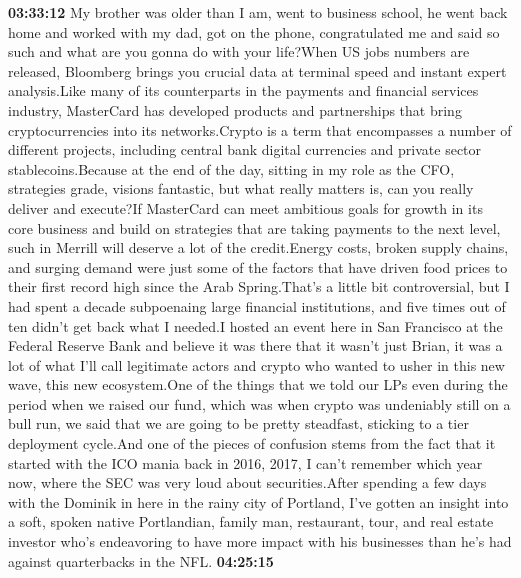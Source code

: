 \documentclass{article}%
\begin{document}
\textbf{03:33:12}%
\newline%
My brother was older than I am, went to business school, he went back home and worked with my dad, got on the phone, congratulated me and said so such and what are you gonna do with your life?When US jobs numbers are released, Bloomberg brings you crucial data at terminal speed and instant expert analysis.Like many of its counterparts in the payments and financial services industry, MasterCard has developed products and partnerships that bring cryptocurrencies into its networks.Crypto is a term that encompasses a number of different projects, including central bank digital currencies and private sector stablecoins.Because at the end of the day, sitting in my role as the CFO, strategies grade, visions fantastic, but what really matters is, can you really deliver and execute?If MasterCard can meet ambitious goals for growth in its core business and build on strategies that are taking payments to the next level, such in Merrill will deserve a lot of the credit.Energy costs, broken supply chains, and surging demand were just some of the factors that have driven food prices to their first record high since the Arab Spring.That's a little bit controversial, but I had spent a decade subpoenaing large financial institutions, and five times out of ten didn't get back what I needed.I hosted an event here in San Francisco at the Federal Reserve Bank and believe it was there that it wasn't just Brian, it was a lot of what I'll call legitimate actors and crypto who wanted to usher in this new wave, this new ecosystem.One of the things that we told our LPs even during the period when we raised our fund, which was when crypto was undeniably still on a bull run, we said that we are going to be pretty steadfast, sticking to a tier deployment cycle.And one of the pieces of confusion stems from the fact that it started with the ICO mania back in 2016, 2017, I can't remember which year now, where the SEC was very loud about securities.After spending a few days with the Dominik in here in the rainy city of Portland, I've gotten an insight into a soft, spoken native Portlandian, family man, restaurant, tour, and real estate investor who's endeavoring to have more impact with his businesses than he's had against quarterbacks in the NFL.%
\textbf{04:25:15}%
\newline%
\end{document}
